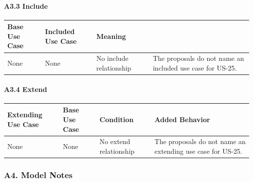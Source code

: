 \documentclass[12pt]{article}
\renewcommand{\baselinestretch}{1.5}
\begin{document}
\hypertarget{sec:a3-3-include}{}
\paragraph*{A3.3 Include}
\par\medskip

\begingroup
\small
\renewcommand{\baselinestretch}{1.0}\selectfont
\renewcommand{\arraystretch}{1.15}
\setlength{\tabcolsep}{6pt}
\begin{longtable}{|>{\raggedright\arraybackslash}p{}|>{\raggedright\arraybackslash}p{}|>{\raggedright\arraybackslash}p{}|}
\hline
\textbf{Base Use Case} & \textbf{Included Use Case} & \textbf{Meaning} \\ \hline
\endhead
None & None & No include relationship & The proposals do not name an included use case for US-25. \\ \hline
\end{longtable}
\endgroup
\par\medskip

\hypertarget{sec:a3-4-extend}{}
\paragraph*{A3.4 Extend}
\par\medskip

\begingroup
\small
\renewcommand{\baselinestretch}{1.0}\selectfont
\renewcommand{\arraystretch}{1.15}
\setlength{\tabcolsep}{6pt}
\begin{longtable}{|>{\raggedright\arraybackslash}p{}|>{\raggedright\arraybackslash}p{}|>{\raggedright\arraybackslash}p{}|>{\raggedright\arraybackslash}p{}|}
\hline
\textbf{Extending Use Case} & \textbf{Base Use Case} & \textbf{Condition} & \textbf{Added Behavior} \\ \hline
\endhead
None & None & No extend relationship & The proposals do not name an extending use case for US-25. \\ \hline
\end{longtable}
\endgroup
\par\medskip

\hypertarget{sec:a4-model-notes}{}
\subsubsection*{A4. Model Notes}
\par\medskip
\end{document}
